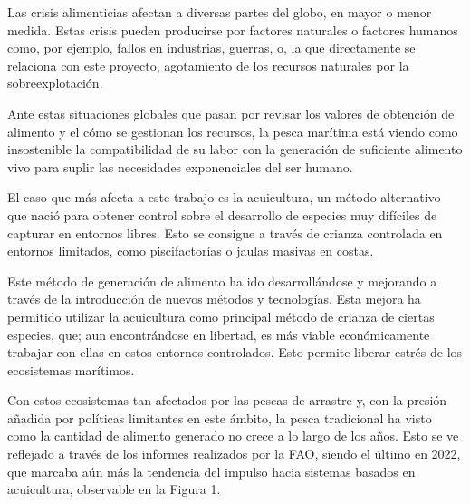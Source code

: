 
Las crisis alimenticias afectan a diversas partes del globo, en mayor o menor medida. Estas crisis pueden producirse por factores naturales o factores humanos como, por ejemplo, fallos en industrias, guerras, o, la que directamente se relaciona con este proyecto, agotamiento de los recursos naturales por la sobreexplotación.

Ante estas situaciones globales que pasan por revisar los valores de obtención de alimento y el cómo se gestionan los recursos, la pesca marítima está viendo como insostenible la compatibilidad de su labor con la generación de suficiente alimento vivo para suplir las necesidades exponenciales del ser humano.

El caso que más afecta a este trabajo es la acuicultura, un método alternativo que nació para obtener control sobre el desarrollo de especies muy difíciles de capturar en entornos libres. Esto se consigue a través de crianza controlada en entornos limitados, como piscifactorías o jaulas masivas en costas.

Este método de generación de alimento ha ido desarrollándose y mejorando a través de la introducción de nuevos métodos y tecnologías. Esta mejora ha permitido utilizar la acuicultura como principal método de crianza de ciertas especies, que; aun encontrándose en libertad, es más viable económicamente trabajar con ellas en estos entornos controlados. Esto permite liberar estrés de los ecosistemas marítimos.

Con estos ecosistemas tan afectados por las pescas de arrastre y, con la presión añadida por políticas limitantes en este ámbito, la pesca tradicional ha visto como la cantidad de alimento generado no crece a lo largo de los años. Esto se ve reflejado a través de los informes realizados por la FAO, siendo el último en 2022, que marcaba aún más la tendencia del impulso hacia sistemas basados en acuicultura, observable en la Figura 1.
